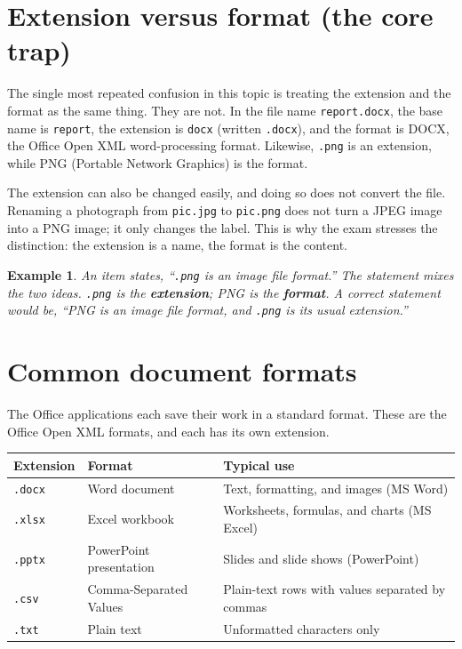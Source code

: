 \documentclass[11pt]{article}
\newtheorem{example}{Example}[section]
\begin{document}
\section{Extension versus format (the core trap)}
The single most repeated confusion in this topic is treating the extension and
the format as the same thing. They are not. In the file name
\texttt{report.docx}, the base name is \texttt{report}, the extension is
\texttt{docx} (written \texttt{.docx}), and the format is DOCX, the Office
Open XML word-processing format. Likewise, \texttt{.png} is an extension,
while PNG (Portable Network Graphics) is the format.

The extension can also be changed easily, and doing so does not convert the
file. Renaming a photograph from \texttt{pic.jpg} to \texttt{pic.png} does
not turn a JPEG image into a PNG image; it only changes the label. This is
why the exam stresses the distinction: the extension is a name, the format is
the content.

\begin{example}
An item states, ``\texttt{.png} is an image file format.'' The statement
mixes the two ideas. \texttt{.png} is the \textbf{extension}; PNG is the
\textbf{format}. A correct statement would be, ``PNG is an image file format,
and \texttt{.png} is its usual extension.''
\end{example}

\section{Common document formats}
The Office applications each save their work in a standard format. These are
the Office Open XML formats, and each has its own extension.

\begin{center}
\begin{tabular}{p{}p{}p{}}
\toprule
\textbf{Extension} & \textbf{Format} & \textbf{Typical use} \\
\midrule
\texttt{.docx} & Word document & Text, formatting, and images (MS Word) \\
\texttt{.xlsx} & Excel workbook & Worksheets, formulas, and charts (MS Excel) \\
\texttt{.pptx} & PowerPoint presentation & Slides and slide shows (PowerPoint) \\
\texttt{.csv} & Comma-Separated Values & Plain-text rows with values separated by commas \\
\texttt{.txt} & Plain text & Unformatted characters only \\
\bottomrule
\end{tabular}
\end{center}
\end{document}
